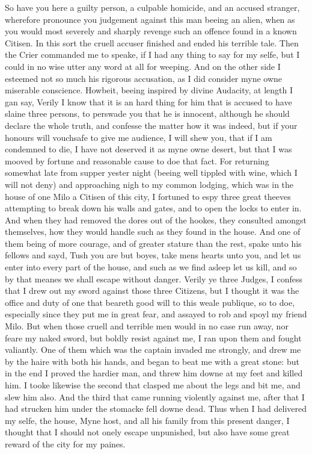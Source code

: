 So have you here a guilty person, a culpable homicide, and an accused stranger,
wherefore pronounce you judgement against this man beeing an alien, when as you
would most severely and sharply revenge such an offence found in a known
Citisen. In this sort the cruell accuser finished and ended his terrible tale.
Then the Crier commanded me to speake, if I had any thing to say for my selfe,
but I could in no wise utter any word at all for weeping. And on the other side
I esteemed not so much his rigorous accusation, as I did consider myne owne
miserable conscience. Howbeit, beeing inspired by divine Audacity, at length I
gan say, Verily I know that it is an hard thing for him that is accused to have
slaine three persons, to perswade you that he is innocent, although he should
declare the whole truth, and confesse the matter how it was indeed, but if your
honours will vouchsafe to give me audience, I will shew you, that if I am
condemned to die, I have not deserved it as myne owne desert, but that I was
mooved by fortune and reasonable cause to doe that fact. For returning somewhat
late from supper yester night (beeing well tippled with wine, which I will not
deny) and approaching nigh to my common lodging, which was in the house of one
Milo a Citisen of this city, I fortuned to espy three great theeves attempting
to break down his walls and gates, and to open the locks to enter in. And when
they had removed the dores out of the hookes, they consulted amongst
themselves, how they would handle such as they found in the house. And one of
them being of more courage, and of greater stature than the rest, spake unto
his fellows and sayd, Tush you are but boyes, take mens hearts unto you, and
let us enter into every part of the house, and such as we find asleep let us
kill, and so by that meanes we shall escape without danger. Verily ye three
Judges, I confess that I drew out my sword against those three Citizens, but I
thought it was the office and duty of one that beareth good will to this weale
publique, so to doe, especially since they put me in great fear, and assayed to
rob and spoyl my friend Milo. But when those cruell and terrible men would in
no case run away, nor feare my naked sword, but boldly resist against me, I ran
upon them and fought valiantly. One of them which was the captain invaded me
strongly, and drew me by the haire with both his hands, and began to beat me
with a great stone: but in the end I proved the hardier man, and threw him
downe at my feet and killed him. I tooke likewise the second that clasped me
about the legs and bit me, and slew him also. And the third that came running
violently against me, after that I had strucken him under the stomacke fell
downe dead. Thus when I had delivered my selfe, the house, Myne host, and all
his family from this present danger, I thought that I should not onely escape
unpunished, but also have some great reward of the city for my paines.

